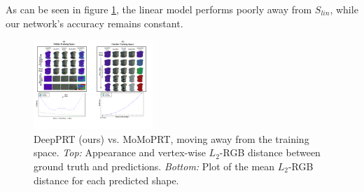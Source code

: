 As can be seen in figure \ref{Fig:DPRT vs MoMoPRT B}, the linear model performs poorly away from $S_{lin}$, while our network's accuracy remains constant.
\begin{figure}[h]
  \centering
    \includegraphics[width=0.4\textwidth]{Figures/DPRT_vs_MoMoPRT_b.pdf}
     \caption{DeepPRT (ours) vs. MoMoPRT, moving away from the training space. \textit{Top:} Appearance and vertex-wise $L_2$-RGB distance between ground truth and predictions.\textit{ Bottom:} Plot of the mean $L_2$-RGB distance for each predicted shape.}
     \label{Fig:DPRT vs MoMoPRT B}
\end{figure}

